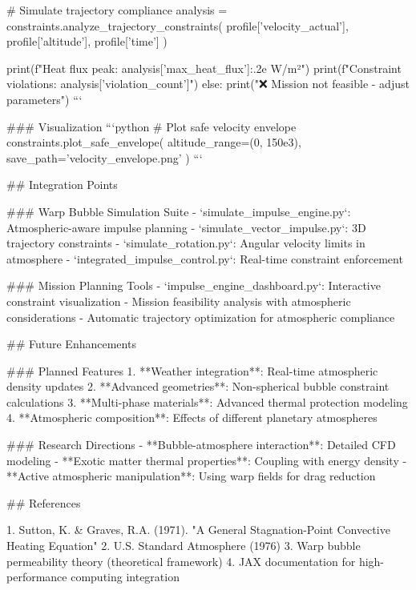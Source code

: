     # Simulate trajectory compliance
    analysis = constraints.analyze_trajectory_constraints(
        profile['velocity_actual'],
        profile['altitude'], 
        profile['time']
    )
    
    print(f"Heat flux peak: {analysis['max_heat_flux']:.2e} W/m²")
    print(f"Constraint violations: {analysis['violation_count']}")
else:
    print("❌ Mission not feasible - adjust parameters")
```

### Visualization
```python
# Plot safe velocity envelope
constraints.plot_safe_envelope(
    altitude_range=(0, 150e3),
    save_path='velocity_envelope.png'
)
```

## Integration Points

### Warp Bubble Simulation Suite
- `simulate_impulse_engine.py`: Atmospheric-aware impulse planning
- `simulate_vector_impulse.py`: 3D trajectory constraints
- `simulate_rotation.py`: Angular velocity limits in atmosphere
- `integrated_impulse_control.py`: Real-time constraint enforcement

### Mission Planning Tools
- `impulse_engine_dashboard.py`: Interactive constraint visualization
- Mission feasibility analysis with atmospheric considerations
- Automatic trajectory optimization for atmospheric compliance

## Future Enhancements

### Planned Features
1. **Weather integration**: Real-time atmospheric density updates
2. **Advanced geometries**: Non-spherical bubble constraint calculations
3. **Multi-phase materials**: Advanced thermal protection modeling
4. **Atmospheric composition**: Effects of different planetary atmospheres

### Research Directions
- **Bubble-atmosphere interaction**: Detailed CFD modeling
- **Exotic matter thermal properties**: Coupling with energy density
- **Active atmospheric manipulation**: Using warp fields for drag reduction

## References

1. Sutton, K. & Graves, R.A. (1971). "A General Stagnation-Point Convective Heating Equation"
2. U.S. Standard Atmosphere (1976)
3. Warp bubble permeability theory (theoretical framework)
4. JAX documentation for high-performance computing integration
